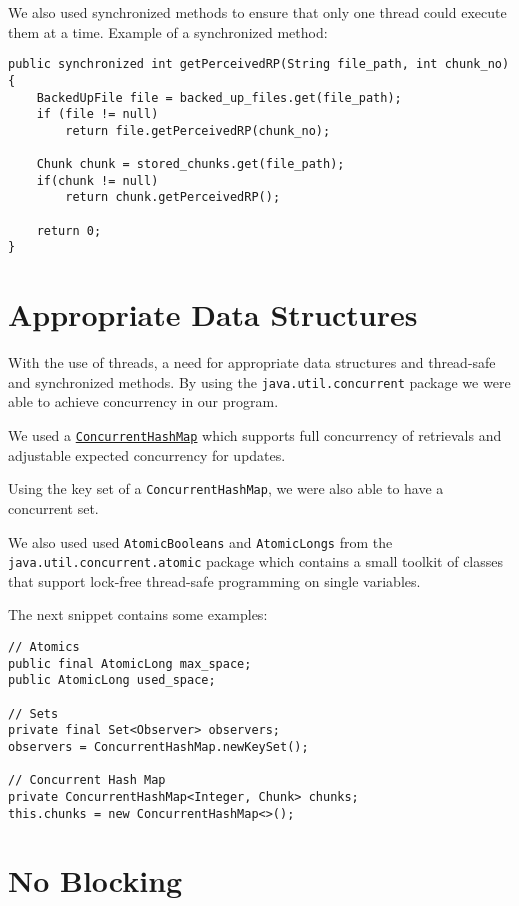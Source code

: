 \documentclass[11pt]{report}
\begin{document}
We also used synchronized methods to ensure that only one thread could execute them at a time. Example of a synchronized method:

\begin{verbatim}
public synchronized int getPerceivedRP(String file_path, int chunk_no) {
    BackedUpFile file = backed_up_files.get(file_path);
    if (file != null)
        return file.getPerceivedRP(chunk_no);

    Chunk chunk = stored_chunks.get(file_path);
    if(chunk != null)
        return chunk.getPerceivedRP();

    return 0;
}
\end{verbatim}

\section{Appropriate Data Structures}

With the use of threads, a need for appropriate data structures and thread-safe and synchronized methods. By using the \texttt{java.util.concurrent} package we were able to achieve concurrency in our program. 

We used a \texttt{\href{https://docs.oracle.com/javase/7/docs/api/java/util/concurrent/ConcurrentHashMap.html}{ConcurrentHashMap}}  which supports full concurrency of retrievals and adjustable expected concurrency for updates. 

Using the key set of a \texttt{ConcurrentHashMap}, we were also able to have a concurrent set. 

We also used used \texttt{AtomicBooleans} and \texttt{AtomicLongs} from the \newline \texttt{java.util.concurrent.atomic} package which contains a small toolkit of classes that support lock-free thread-safe programming on single variables.

The next snippet contains some examples:

\begin{verbatim}
// Atomics
public final AtomicLong max_space;
public AtomicLong used_space;

// Sets
private final Set<Observer> observers;
observers = ConcurrentHashMap.newKeySet();

// Concurrent Hash Map
private ConcurrentHashMap<Integer, Chunk> chunks;
this.chunks = new ConcurrentHashMap<>();
\end{verbatim}

\section{No Blocking}
\end{document}
